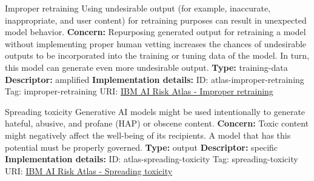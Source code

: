 \documentclass[a4paper,12pt]{article}
\begin{document}
\begin{definitionbox}{Improper retraining}
Using undesirable output (for example, inaccurate, inappropriate, and user content) for retraining purposes can result in unexpected model behavior.\newline\newline
\textbf{Concern: }Repurposing generated output for retraining a model without implementing proper human vetting increases the chances of undesirable outputs to be incorporated into the training or tuning data of the model. In turn, this model can generate even more undesirable output.\newline\newline
\textbf{Type: }training-data\newline
\textbf{Descriptor: }amplified \newline\newline
\textbf{Implementation details: } \newline
ID: atlas-improper-retraining \newline
Tag: improper-retraining \newline
URI:  \href{https://www.ibm.com/docs/en/watsonx/saas?topic=SSYOK8/wsj/ai-risk-atlas/improper-retraining.html}{IBM AI Risk Atlas - Improper retraining}\newline
\end{definitionbox}
\begin{definitionbox}{Spreading toxicity}
Generative AI models might be used intentionally to generate hateful, abusive, and profane (HAP) or obscene content.\newline\newline
\textbf{Concern: }Toxic content might negatively affect the well-being of its recipients. A model that has this potential must be properly governed.\newline\newline
\textbf{Type: }output\newline
\textbf{Descriptor: }specific \newline\newline
\textbf{Implementation details: } \newline
ID: atlas-spreading-toxicity \newline
Tag: spreading-toxicity \newline
URI:  \href{https://www.ibm.com/docs/en/watsonx/saas?topic=SSYOK8/wsj/ai-risk-atlas/spreading-toxicity.html}{IBM AI Risk Atlas - Spreading toxicity}\newline
\end{definitionbox}
\end{document}
